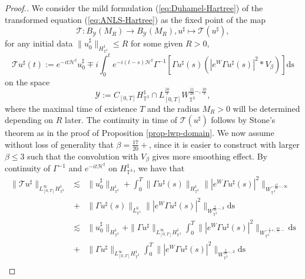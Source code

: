\begin{proof}[Proof.]
  We consider the mild formulation (\ref{eq:Duhamel-Hartree}) of the
  transformed equation (\ref{eq:ANLS-Hartree}) as the fixed point of the map
  \begin{equation}
    \mathcal{T} : B_{\mathcal{Y}} (M_R) \rightarrow B_{\mathcal{Y}} (M_R),
    u^{\sharp} \mapsto \mathcal{T} (u^{\sharp}), \label{eq:def-S-energy-dom}
  \end{equation}
  for any initial data $\| u_0^{\sharp} \|_{H_{\mathbb{T}^3}^1} \leqslant R$
  for some given $R > 0$,
  \[ \mathcal{T} u^{\sharp} (t) := e^{- i t \mathcal{H}^{\sharp}}
     u_0^{\sharp} \mp i \int^t_0 e^{- i (t - s) \mathcal{H}^{\sharp}}
     \Gamma^{- 1} [\Gamma u^{\sharp} (s) (| e^W \Gamma u^{\sharp} (s) |^2 \ast
     V_{\beta})] \mathrm{ds} \]
  on the space
  \[ \mathcal{Y} := C_{[0, T]} H_{\mathbb{T}^3}^1 \cap L_{[0,
     T]}^{\frac{10}{3}} {W_{\mathbb{T}^3}^{\frac{11}{20} -, \frac{10}{3}}} ,
  \]
  where the maximal time of existence $T$ and the radius $M_R > 0$ will be
  determined depending on $R$ later. The continuity in time of $\mathcal{T}
  (u^{\sharp})$ follows by Stone's theorem as in the proof of Proposition
  \ref{prop-lwp-domain}. We now assume without loss of generality that $\beta = \frac{17}{20} +$,
  since it is easier to construct with larger $\beta \leqslant 3$ such that
  the convolution with $V_{\beta}$ gives more smoothing effect. By continuity
  of $\Gamma^{- 1}$ and $e^{- i t \mathcal{H}^{\sharp}}$ on
  $H_{\mathbb{T}^3}^1$, we have that
  \begin{eqnarray*}
    \| \mathcal{T} u^{\sharp} \|_{L_{[0, T]}^{\infty} H_{\mathbb{T}^3}^1} 
    &
    \lesssim & \| u_0^{\sharp} \|_{H_{\mathbb{T}^3}^1} + \int^T_0 \| \Gamma
    u^{\sharp} (s) \|_{H_{\mathbb{T}^3}^1} \| | e^W \Gamma u^{\sharp} (s) |^2
    \|_{W_{\mathbb{T}^3}^{- \frac{17}{20} -, \infty}} \\
    & + & \| \Gamma u^{\sharp}
    (s) \|_{L_{\mathbb{T}^3}^6} \| | e^W \Gamma u^{\sharp} (s) |^2
    \|_{W_{\mathbb{T}^3}^{\frac{3}{20} -, 3}} \mathrm{ds}\\
    & \lesssim & \| u_0^{\sharp} \|_{H_{\mathbb{T}^3}^1} + \| \Gamma
    u^{\sharp} \|_{L_{[0, T]}^{\infty} H_{\mathbb{T}^3}^1} \int^T_0 \|
    | e^W \Gamma u^{\sharp} (s) |^2 \|_{W_{\mathbb{T}^3}^{- \frac{1}{2} +,
    \frac{60}{7} -}}  \mathrm{ds}\\
    &+& \| \Gamma
    u^{\sharp} \|_{L_{[0, T]}^{\infty} H_{\mathbb{T}^3}^1} \int^T_0 \| | e^W \Gamma u^{\sharp} (s) |^2
    \|_{W_{\mathbb{T}^3}^{\frac{3}{20} -, 3}}  \mathrm{ds}\\

\end{eqnarray*}
\end{proof}
